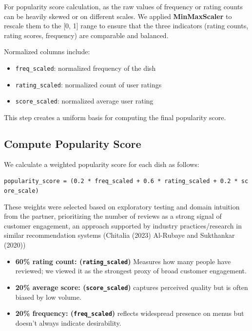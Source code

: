 \documentclass[
  11pt,
  a4paper,
  DIV=11,
  numbers=noendperiod]{scrartcl}
\providecommand{\tightlist}{%
  \setlength{\itemsep}{0pt}\setlength{\parskip}{0pt}}\usepackage{longtable,booktabs,array}
\begin{document}
For popularity score calculation, as the raw values of frequency or
rating counts can be heavily skewed or on different scales. We applied
\textbf{MinMaxScaler} to rescale them to the {[}0, 1{]} range to ensure
that the three indicators (rating counts, rating scores, frequency) are
comparable and balanced.

Normalized columns include:

\begin{itemize}
\tightlist
\item
  \texttt{freq\_scaled}: normalized frequency of the dish
\item
  \texttt{rating\_scaled}: normalized count of user ratings
\item
  \texttt{score\_scaled}: normalized average user rating
\end{itemize}

This step creates a uniform basis for computing the final popularity
score.

\subsection{Compute Popularity Score}\label{compute-popularity-score}

We calculate a weighted popularity score for each dish as follows:

\texttt{popularity\_score\ =\ (0.2\ *\ freq\_scaled\ +\ 0.6\ *\ rating\_scaled\ +\ 0.2\ *\ score\_scale)}

These weights were selected based on exploratory testing and domain
intuition from the partner, prioritizing the number of reviews as a
strong signal of customer engagement, an approach supported by industry
practices/research in similar recommendation systems (Chitalia (2023)
Al-Rubaye and Sukthankar (2020))

\begin{itemize}
\tightlist
\item
  \textbf{60\% rating count: (\texttt{rating\_scaled})} Measures how
  many people have reviewed; we viewed it as the strongest proxy of
  broad customer engagement.
\item
  \textbf{20\% average score: (\texttt{score\_scaled})} captures
  perceived quality but is often biased by low volume.
\item
  \textbf{20\% frequency: (\texttt{freq\_scaled})} reflects widespread
  presence on menus but doesn't always indicate desirability.
\end{itemize}
\end{document}
